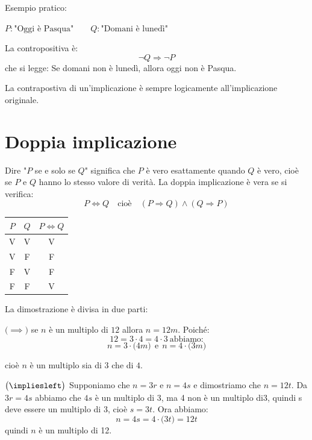 \begin{esempio}
Esempio pratico:

\(
P: \text{"Oggi è Pasqua"} \qquad Q: \text{"Domani è lunedì"}
\)

La contropositiva è:
\[
\neg Q \Rightarrow \neg P
\]
che si legge: Se domani non è lunedì, allora oggi non è Pasqua.

\medskip
La contrapostiva di un'implicazione è sempre logicamente all'implicazione originale.
\end{esempio}


\section{Doppia implicazione}
Dire "$P$ se e solo se $Q$" significa che \(P\) è vero esattamente quando \(Q\) è vero, cioè se \(P\) e \(Q\) hanno lo stesso valore di verità. La doppia implicazione è vera se si verifica:
\[
    P \iff Q \quad \text{cioè} \quad (P\Rightarrow Q) \land (Q\Rightarrow P)
\]





\begin{center}
\begin{tabular}{c|c|c}
  \(P\) & \(Q\) & \(P \iff Q\) \\
  \hline
  V & V & V \\
  V & F & F \\
  F & V & F \\
  F & F & V \\
\end{tabular}
\end{center}


{La dimostrazione è divisa in due parti:

$\bigl(\implies\bigr)$ se $n$ è un multiplo di $12$ allora $n=12m$. Poiché:
\[
12=3\cdot4=4\cdot3 \ \text{abbiamo:}
\]
\[
 n = 3 \cdot \bigl(4m\bigr) \ \ \text{e} \ \ n= 4\cdot\bigl(3m\bigr)
\]
\vspace{0.1cm}

cioè $n$ è un multiplo sia di $3$ che di $4$.
\vspace{0.2cm}

$\bigl(\impliesleft\bigr)$ Supponiamo che $n=3r$ e $n=4s$ e dimostriamo che $n=12t$. Da $3r=4s$ abbiamo che $4s$ è un multiplo di $3$, ma 4 non è un multiplo di$3$, quindi s deve essere un multiplo di 3, cioè $s=3t$. Ora abbiamo:
\[
n=4s=4\cdot\bigl(3t\bigr)=12t
\]
quindi $n$ è un multiplo di 12.}


